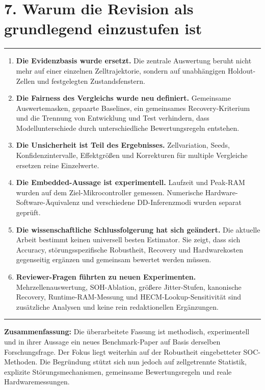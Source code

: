 \documentclass[10pt,a4paper]{article}
\newcommand{\sectionrule}{\vspace{-2pt}\color{tured}\rule{\textwidth}{0.7pt}\color{black}\vspace{2pt}}
\begin{document}
\clearpage
\pagestyle{fancy}
\thispagestyle{fancy}
\section*{7. Warum die Revision als grundlegend einzustufen ist}
\sectionrule

\begin{enumerate}[leftmargin=6mm,itemsep=3pt]
\item \textbf{Die Evidenzbasis wurde ersetzt.} Die zentrale Auswertung beruht nicht mehr auf einer einzelnen Zelltrajektorie, sondern auf unabhängigen Holdout-Zellen und festgelegten Zustandsfenstern.
\item \textbf{Die Fairness des Vergleichs wurde neu definiert.} Gemeinsame Auswertemasken, gepaarte Baselines, ein gemeinsames Recovery-Kriterium und die Trennung von Entwicklung und Test verhindern, dass Modellunterschiede durch unterschiedliche Bewertungsregeln entstehen.
\item \textbf{Die Unsicherheit ist Teil des Ergebnisses.} Zellvariation, Seeds, Konfidenzintervalle, Effektgrößen und Korrekturen für multiple Vergleiche ersetzen reine Einzelwerte.
\item \textbf{Die Embedded-Aussage ist experimentell.} Laufzeit und Peak-RAM wurden auf dem Ziel-Mikrocontroller gemessen. Numerische Hardware-Software-Äquivalenz und verschiedene DD-Inferenzmodi wurden separat geprüft.
\item \textbf{Die wissenschaftliche Schlussfolgerung hat sich geändert.} Die aktuelle Arbeit bestimmt keinen universell besten Estimator. Sie zeigt, dass sich Accuracy, störungsspezifische Robustheit, Recovery und Hardwarekosten gegenseitig ergänzen und gemeinsam bewertet werden müssen.
\item \textbf{Reviewer-Fragen führten zu neuen Experimenten.} Mehrzellenauswertung, SOH-Ablation, größere Jitter-Stufen, kanonische Recovery, Runtime-RAM-Messung und HECM-Lookup-Sensitivität sind zusätzliche Analysen und keine rein redaktionellen Ergänzungen.
\end{enumerate}

\vfill
{\color{tured}\rule{\textwidth}{1.2pt}}
\textbf{Zusammenfassung:} Die überarbeitete Fassung ist methodisch, experimentell und in ihrer Aussage ein neues Benchmark-Paper auf Basis derselben Forschungsfrage. Der Fokus liegt weiterhin auf der Robustheit eingebetteter SOC-Methoden. Die Begründung stützt sich nun jedoch auf zellgetrennte Statistik, explizite Störungsmechanismen, gemeinsame Bewertungsregeln und reale Hardwaremessungen.
\end{document}
